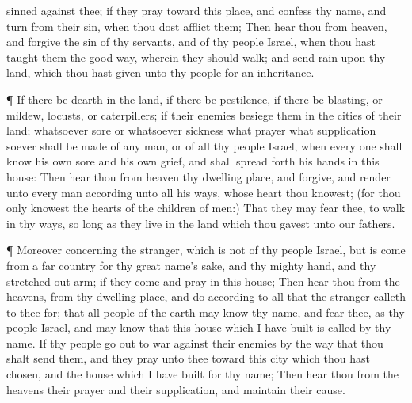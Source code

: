 {sinned against thee;
{} if they
pray toward this
place, and
confess thy
name, and
turn from their
sin, when thou dost
afflict them;
Then
hear thou from
heaven, and
forgive the
sin of thy
servants, and of thy
people
Israel, when thou hast
taught them the
good
way, wherein they should
walk; and
send
rain upon thy
land, which thou hast
given unto thy
people for an
inheritance.
\par }{\PP {}¶ If there be
dearth in the
land, if there be
pestilence, if there be
blasting, or
mildew,
locusts, or
caterpillers; if their
enemies
besiege them in the
cities of their
land; whatsoever
sore or whatsoever
sickness
{}
 what
prayer
{} what
supplication soever shall be made of any
man, or of all thy
people
Israel, when every
one shall
know his own
sore and his own
grief, and shall spread
forth his
hands in this
house:
Then
hear thou from
heaven thy
dwelling
place, and
forgive, and
render unto every
man according unto all his
ways, whose
heart thou
knowest; (for thou only
knowest the
hearts of the
children of
men:)
That they may
fear thee, to
walk in thy
ways, so long
as they
live in the
land which thou
gavest unto our
fathers.
\par }{\PP {}¶ Moreover concerning the
stranger, which is not of thy
people
Israel, but is
come from a
far
country for thy
great
name’s sake, and thy
mighty
hand, and thy stretched
out
arm; if they
come and
pray in this
house;
Then
hear thou from the
heavens,
{} from thy
dwelling
place, and
do according to all that the
stranger
calleth to thee for; that all
people of the
earth may
know thy
name, and
fear thee, as
{} thy
people
Israel, and may
know that this
house which I have
built is
called by thy
name.
If thy
people go
out to
war against their
enemies by the
way that thou shalt
send them, and they
pray unto thee
toward this
city which thou hast
chosen, and the
house which I have
built for thy
name;
Then
hear thou from the
heavens their
prayer and their
supplication, and
maintain their
cause.
}
